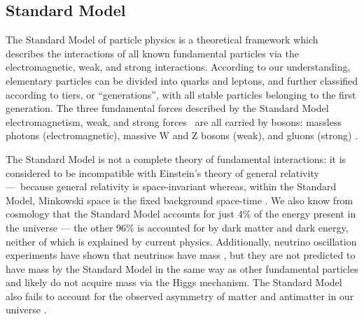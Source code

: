\subsection{Standard Model}
The Standard Model of particle physics is a theoretical framework which describes the interactions of all known fundamental particles via the electromagnetic, weak, and strong interactions. According to our understanding, elementary particles can be divided into quarks and leptons, and further classified according to tiers, or ``generations'', with all stable particles belonging to the first generation. The three fundamental forces described by the Standard Model \textemdash \, electromagnetism, weak, and strong forces \textemdash \, are all carried by bosons: massless photons (electromagnetic), massive W and Z bosons (weak), and gluons (strong) \cite{CERN:SM:Online}.

The Standard Model is not a complete theory of fundamental interactions: it is considered to be incompatible with Einstein's theory of general relativity — because general relativity is space-invariant whereas, within the Standard Model, Minkowski space is the fixed background space-time \cite{Colosi:2005:CQG}. We also know from cosmology that the Standard Model accounts for just 4\% of the energy present in the universe — the other 96\% is accounted for by dark matter and dark energy, neither of which is explained by current physics\cite{Krauss:2009:Conference}. Additionally, neutrino oscillation experiments have shown that neutrinos have mass \cite{Fukuda:1998:Kamiokande}, but they are not predicted to have mass by the Standard Model in the same way as other fundamental particles and likely do not acquire mass via the Higgs mechanism. The Standard Model also fails to account for the observed asymmetry of matter and antimatter in our universe \cite{Sather:1999:MatterA}.

